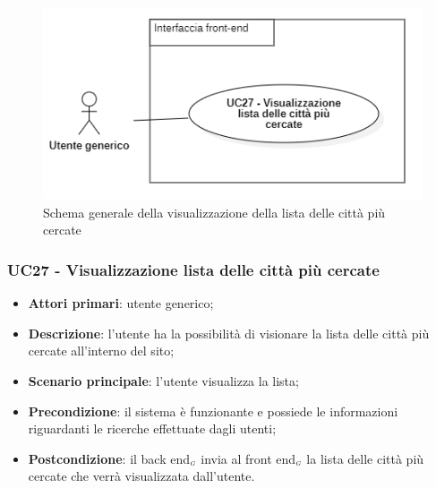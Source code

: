 \begin{center}
	\begin{figure}[H]
		\centering\includegraphics[scale=0.7]{../immagini/attori_casi/UC_27.png}
		\caption{Schema generale della visualizzazione della lista delle città più cercate}
	\end{figure}
\end{center}


\subsubsection{UC27 - Visualizzazione lista delle città più cercate}\label{CasiDUsoCasiDUsoFacoltativiTraUnUtenteEIlFrontEndElencoCasiDUsoUC17VisualizzazioneListaDelleCittaPiuCercate}

\begin{itemize}
	\item \textbf{Attori primari}: utente generico;
	\item \textbf{Descrizione}: l'utente ha la possibilità di visionare la lista delle città più cercate all'interno del sito;
	\item \textbf{Scenario principale}: l'utente visualizza la lista;
	\item \textbf{Precondizione}: il sistema è funzionante e possiede le informazioni riguardanti le ricerche effettuate dagli utenti;
	\item \textbf{Postcondizione}: il back end$_{\scaleto{G}{3pt}}$ invia al front end$_{\scaleto{G}{3pt}}$ la lista delle città più cercate che verrà visualizzata dall'utente.
\end{itemize}




